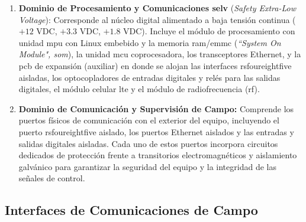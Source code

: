 \begin{enumerate}
    \item \textbf{Dominio de Procesamiento y Comunicaciones \gls{selv}} (\textit{Safety Extra-Low Voltage}): Corresponde al núcleo digital alimentado a baja tensión continua ($+12\text{ VDC}$, $+3.3\text{ VDC}$, $+1.8\text{ VDC}$). Incluye el módulo de procesamiento con unidad \gls{mpu} con Linux embebido y la memoria \gls{ram}/\gls{emmc} (\textit{``System On Module", \gls{som}}), la unidad \gls{mcu} coprocesadora, los transceptores Ethernet, y la \gls{pcb} de expansión (auxiliar) en donde se alojan las interfaces \gls{rsfoureightfive} aisladas, los optocopladores de entradas digitales y relés para las salidas digitales, el módulo celular \gls{lte} y el módulo de radiofrecuencia (\gls{rf}).
    \item \textbf{Dominio de Comunicación y Supervisión de Campo:} Comprende los puertos físicos de comunicación con el exterior del equipo, incluyendo el puerto \gls{rsfoureightfive} aislado, los puertos Ethernet aislados y las entradas y salidas digitales aisladas. Cada uno de estos puertos incorpora circuitos dedicados de protección frente a transitorios electromagnéticos y aislamiento galvánico para garantizar la seguridad del equipo y la integridad de las señales de control.
\end{enumerate}

\subsection{Interfaces de Comunicaciones de Campo}
\label{subsec:interfaces_comunicaciones}

